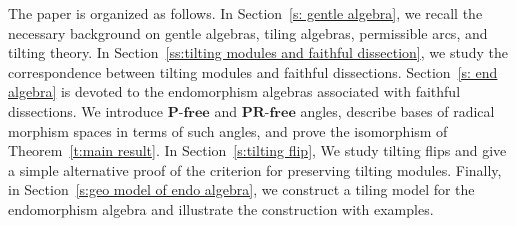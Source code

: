 \documentclass[a4paper,10pt]{amsart}
\theoremstyle{plain}          %
\theoremstyle{definition}
\def\SS{\mathbf{S}}
\def\RR{\mathbf{R}}
\def\MM{\mathbf{M}}
\def\PP{\mathbf{P}}
\def\MM{\mathbf{M}}
\newcommand{\End}{\operatorname{End}\nolimits}
\newcommand{\ie}{{\em i.e.}\ }
\begin{document}



The paper is organized as follows. In Section~\ref{s: gentle algebra}, we recall the necessary background on gentle algebras, tiling algebras, permissible arcs, and tilting theory. In Section~\ref{ss:tilting modules and faithful dissection}, we study the correspondence between tilting modules and faithful dissections. Section~\ref{s: end algebra} is devoted to the endomorphism algebras associated with faithful dissections. We introduce $\PP$-$\mathbf{free}$ and $\PP\RR$-$\mathbf{free}$ angles, describe bases of radical morphism spaces in terms of such angles, and prove the isomorphism of Theorem~\ref{t:main result}. In Section~\ref{s:tilting flip}, We study tilting flips and give a simple alternative proof of the criterion for preserving tilting modules. Finally, in Section~\ref{s:geo model of endo algebra}, we construct a tiling model for the endomorphism algebra and illustrate the construction with examples.
\end{document}
